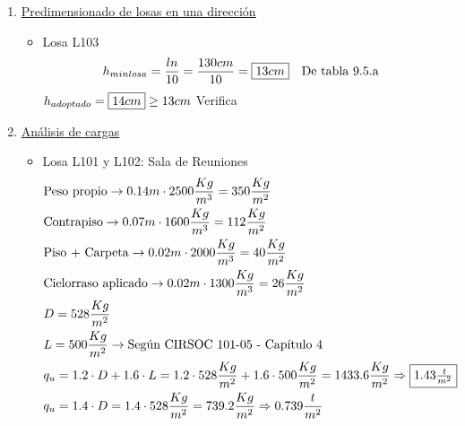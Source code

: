 \begin{enumerate}
\item \underline{Predimensionado de losas en una dirección}\\

\begin{itemize}
\item Losa L103
\begin{align*}
& h_{min losa} = \frac{ln}{10} = \frac{130cm}{10} = \framebox{$13cm$} \quad \text{De tabla 9.5.a}
\end{align*}
$h_{adoptado} = \framebox{$14 cm$} \geq 13cm$ Verifica \\
\end{itemize}

\item \underline{Análisis de cargas}\\

\begin{itemize}
\item Losa L101 y L102: Sala de Reuniones
\begin{align*}
& \text{Peso propio} \rightarrow 0.14m \cdot 2500 \frac{Kg}{m^3} = 350 \frac{Kg}{m^2}\\
& \text{Contrapiso} \rightarrow 0.07m \cdot 1600 \frac{Kg}{m^3} = 112 \frac{Kg}{m^2}\\
& \text{Piso + Carpeta} \rightarrow 0.02m \cdot 2000 \frac{Kg}{m^3} = 40 \frac{Kg}{m^2}\\
& \text{Cielorraso aplicado} \rightarrow  0.02m \cdot 1300 \frac{Kg}{m^3} = 26 \frac{Kg}{m^2}\\
& D = 528 \frac{Kg}{m^2}\\
& L = 500 \frac{Kg}{m^2} \rightarrow \text{Según CIRSOC 101-05 - Capítulo 4}\\
& q_u = 1.2 \cdot D + 1.6 \cdot L = 1.2 \cdot 528 \frac{Kg}{m^2} + 1.6 \cdot 500 \frac{Kg}{m^2} = 1433.6 \frac{Kg}{m^2} \Rightarrow \framebox{$1.43 \frac{t}{m^2}$} \\
& q_u = 1.4 \cdot D = 1.4 \cdot 528 \frac{Kg}{m^2} = 739.2 \frac{Kg}{m^2} \Rightarrow 0.739 \frac{t}{m^2}
\end{align*}


\end{itemize}
\end{enumerate}
